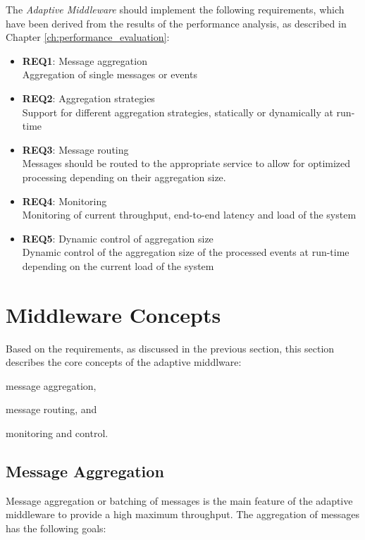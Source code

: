 The \emph{Adaptive Middleware} should implement the following requirements, which have been derived from the results of the performance analysis, as described in Chapter \ref{ch:performance_evaluation}:

\begin{itemize}
	\item \textbf{REQ1}: Message aggregation\\
	Aggregation of single messages or events
	\item \textbf{REQ2}: Aggregation strategies\\
	Support for different aggregation strategies, statically or dynamically at run-time
	\item \textbf{REQ3}: Message routing\\
	Messages should be routed to the appropriate service to allow for optimized processing depending on their aggregation size.
	\item \textbf{REQ4}: Monitoring\\
	Monitoring of current throughput, end-to-end latency and load of the system
	\item \textbf{REQ5}: Dynamic control of aggregation size\\
	Dynamic control of the aggregation size of the processed events at run-time depending on the current load of the system
\end{itemize}

\section{Middleware Concepts}
\label{sec:ch05_middleware_concepts}
Based on the requirements, as discussed in the previous section, this section describes the core concepts of the adaptive middlware: 
\begin{inparaenum}[(1)]
	\item message aggregation,
	\item message routing, and
	\item monitoring and control.
\end{inparaenum}

\subsection{Message Aggregation}
\label{sec:ch05_aggregator}
Message aggregation or batching of messages is the main feature of the adaptive middleware to provide a high maximum throughput.
The aggregation of messages has the following goals:

